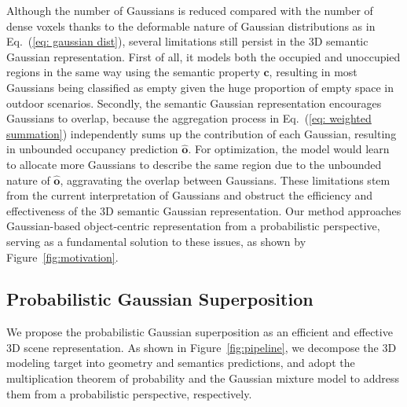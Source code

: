 Although the number of Gaussians is reduced compared with the number of dense voxels thanks to the deformable nature of Gaussian distributions as in Eq.~(\ref{eq: gaussian dist}), several limitations still persist in the 3D semantic Gaussian representation.
First of all, it models both the occupied and unoccupied regions in the same way using the semantic property $\mathbf{c}$, resulting in most Gaussians being classified as empty given the huge proportion of empty space in outdoor scenarios.
Secondly, the semantic Gaussian representation encourages Gaussians to overlap, because the aggregation process in Eq.~(\ref{eq: weighted summation}) independently sums up the contribution of each Gaussian, resulting in unbounded occupancy prediction $\hat{\mathbf{o}}$.
For optimization, the model would learn to allocate more Gaussians to describe the same region due to the unbounded nature of $\hat{\mathbf{o}}$, aggravating the overlap between Gaussians.
These limitations stem from the current interpretation of Gaussians and obstruct the efficiency and effectiveness of the 3D semantic Gaussian representation.
Our method approaches Gaussian-based object-centric representation from a probabilistic perspective, serving as a fundamental solution to these issues, as shown by Figure~\ref{fig:motivation}.


\subsection{Probabilistic Gaussian Superposition}
\label{subsec: prob modeling}
We propose the probabilistic Gaussian superposition as an efficient and effective 3D scene representation.
As shown in Figure~\ref{fig:pipeline}, we decompose the 3D modeling target into geometry and semantics predictions, and adopt the multiplication theorem of probability and the Gaussian mixture model to address them from a probabilistic perspective, respectively.

